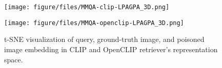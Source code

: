 \begin{figure}[b]
\centering
    \begin{minipage}[b]{0.48\linewidth}
    \centering
    \texttt{[image: figure/files/MMQA-clip-LPAGPA\_3D.png]}
     \vspace{-0.1in}
     \label{fig:CLIP}
    \end{minipage}    
    \begin{minipage}[b]{0.48\linewidth}
    \centering
    \texttt{[image: figure/files/MMQA-openclip-LPAGPA\_3D.png]}
     \vspace{-0.1in}
     \label{fig:OPENCLIP}
    \end{minipage}
    \caption{t-SNE visualization of query, ground-truth image, and poisoned image embedding in CLIP and OpenCLIP retriever's representation space.}
    \vspace{-0.1in}
    \label{fig:app_transfer}
\end{figure}